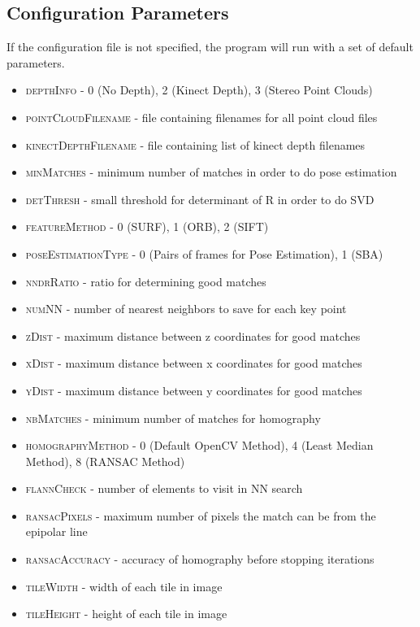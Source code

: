 \documentclass[12pt]{article}
\begin{document}
\subsection{Configuration Parameters}
If the configuration file is not specified, the program will run with a set of default parameters.
\begin{itemize}
	\item{\textsc{depthInfo}} - 0 (No Depth), 2 (Kinect Depth), 3 (Stereo Point Clouds)
	\item{\textsc{pointCloudFilename}} - file containing filenames for all point cloud files
	\item{\textsc{kinectDepthFilename}} - file containing list of kinect depth filenames
	\item{\textsc{minMatches}} - minimum number of matches in order to do pose estimation
	\item{\textsc{detThresh}} - small threshold for determinant of R in order to do SVD
	\item{\textsc{featureMethod}} - 0 (SURF), 1 (ORB), 2 (SIFT)
	\item{\textsc{poseEstimationType}} - 0 (Pairs of frames for Pose Estimation), 1 (SBA)
	\item{\textsc{nndrRatio}} - ratio for determining good matches
	\item{\textsc{numNN}} - number of nearest neighbors to save for each key point
	\item{\textsc{zDist}} - maximum distance between z coordinates for good matches
	\item{\textsc{xDist}} - maximum distance between x coordinates for good matches
	\item{\textsc{yDist}} - maximum distance between y coordinates for good matches
	\item{\textsc{nbMatches}} - minimum number of matches for homography
	\item{\textsc{homographyMethod}} - 0 (Default OpenCV Method), 4 (Least Median Method), 8 (RANSAC Method)
	\item{\textsc{flannCheck}} - number of elements to visit in NN search
	\item{\textsc{ransacPixels}} - maximum number of pixels the match can be from the epipolar line
	\item{\textsc{ransacAccuracy}} - accuracy of homography before stopping iterations
	\item{\textsc{tileWidth}} - width of each tile in image
	\item{\textsc{tileHeight}} - height of each tile in image

\end{itemize}
\end{document}
